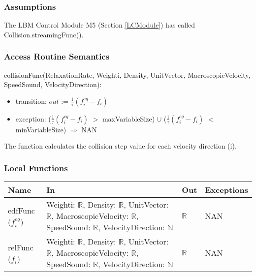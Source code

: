 \documentclass[12pt, titlepage]{article}
\begin{document}
\subsubsection{Assumptions}

The LBM Control Module M5 (Section \ref{LCModule}) has called Collision.streamingFunc().

\subsubsection{Access Routine Semantics}

\noindent collisionFunc(RelaxationRate, Weighti, Density, UnitVector, MacroscopicVelocity, SpeedSound, VelocityDirection):
\begin{itemize}
	\item transition: $out$ := $\frac{1}{\tau}(f_{i}^{eq}-f_{i})$
	\item exception: ($\frac{1}{\tau}(f_{i}^{eq}-f_{i})$ $>$ maxVariableSize) $\cup$ ($\frac{1}{\tau}(f_{i}^{eq}-f_{i})$ $<$ minVariableSize) $\Rightarrow$ NAN
\end{itemize}


The function calculates the collision step value for each velocity direction (i).

\subsubsection{Local Functions}

\begin{center}
	\begin{tabular}{p{2cm} p{3cm} p{4cm} p{2cm}}
		\hline
		\textbf{Name} & \textbf{In} & \textbf{Out} & \textbf{Exceptions} \\
		\hline
		edfFunc ($f_{i}^{eq})$ & Weighti: $\mathbb{R}$, Density: $\mathbb{R}$, UnitVector: $\mathbb{R}$, MacroscopicVelocity: $\mathbb{R}$, SpeedSound: $\mathbb{R}$, VelocityDirection: $\mathbb{N}$ & $\mathbb{R}$ & NAN \\
		relFunc ($f_{i}$) & Weighti: $\mathbb{R}$, Density: $\mathbb{R}$, UnitVector: $\mathbb{R}$, MacroscopicVelocity: $\mathbb{R}$, SpeedSound: $\mathbb{R}$, VelocityDirection: $\mathbb{N}$ & $\mathbb{R}$  & NAN \\
		\hline
	\end{tabular}
\end{center}
\end{document}
